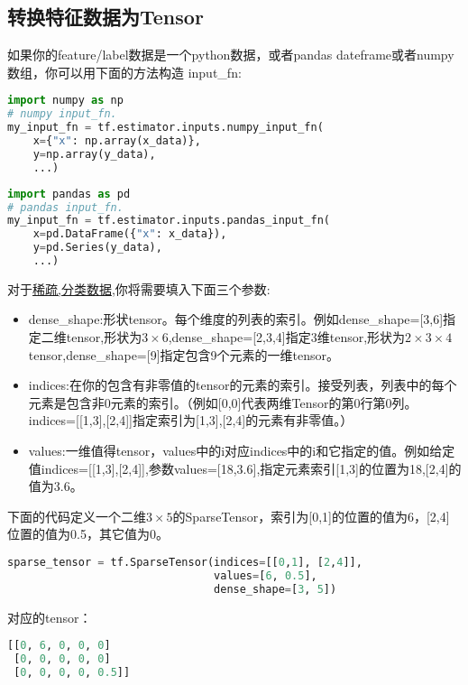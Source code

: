 \subsection{转换特征数据为Tensor}
如果你的feature/label数据是一个python数据，或者pandas dateframe或者numpy数组，你可以用下面的方法构造
input\_fn:
\begin{lstlisting}[language=Python]
import numpy as np
# numpy input_fn.
my_input_fn = tf.estimator.inputs.numpy_input_fn(
    x={"x": np.array(x_data)},
    y=np.array(y_data),
    ...)
\end{lstlisting}
\begin{lstlisting}[language=Python]
import pandas as pd
# pandas input_fn.
my_input_fn = tf.estimator.inputs.pandas_input_fn(
    x=pd.DataFrame({"x": x_data}),
    y=pd.Series(y_data),
    ...)
\end{lstlisting}
对于\href{https://en.wikipedia.org/wiki/Sparse_matrix}{稀疏,分类数据},你将需要填入下面三个参数:
\begin{itemize}
    \item dense\_shape:形状tensor。每个维度的列表的索引。例如dense\_shape=[3,6]指定二维tensor,形状为$3\times6$,dense\_shape=[2,3,4]指定3维tensor,形状为$2\times3\times4$tensor,dense\_shape=[9]指定包含9个元素的一维tensor。
    \item indices:在你的包含有非零值的tensor的元素的索引。接受列表，列表中的每个元素是包含非0元素的索引。（例如[0,0]代表两维Tensor的第0行第0列。indices=[[1,3],[2,4]]指定索引为[1,3],[2,4]的元素有非零值。）
    \item values:一维值得tensor，values中的i对应indices中的i和它指定的值。例如给定值indices=[[1,3],[2,4]],参数values=[18,3.6],指定元素索引[1,3]的位置为18,[2,4]的值为3.6。
\end{itemize}
下面的代码定义一个二维$3\times5$的SparseTensor，索引为[0,1]的位置的值为6，[2,4]位置的值为0.5，其它值为0。
\begin{lstlisting}[language=Python]
sparse_tensor = tf.SparseTensor(indices=[[0,1], [2,4]],
                                values=[6, 0.5],
                                dense_shape=[3, 5])
\end{lstlisting}
对应的tensor：
\begin{lstlisting}[language=Python]
[[0, 6, 0, 0, 0]
 [0, 0, 0, 0, 0]
 [0, 0, 0, 0, 0.5]]
\end{lstlisting}
